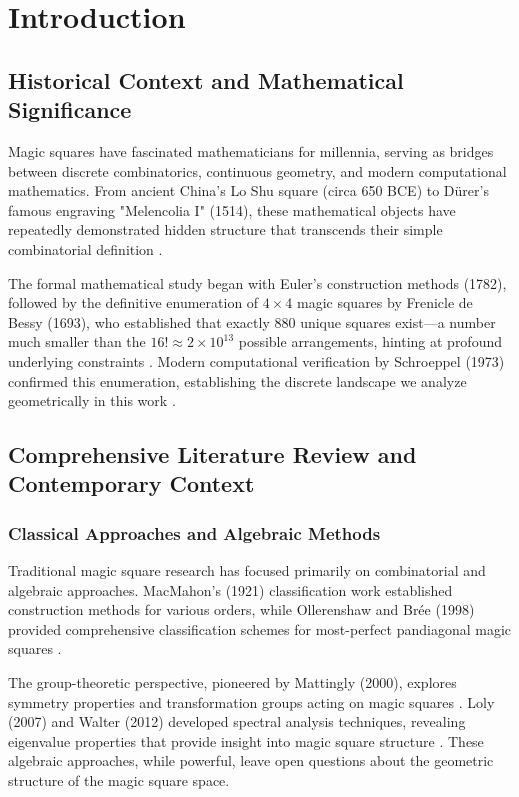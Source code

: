 \section{Introduction}\label{sec:introduction}

\subsection{Historical Context and Mathematical Significance}

Magic squares have fascinated mathematicians for millennia, serving as bridges between discrete combinatorics, continuous geometry, and modern computational mathematics. From ancient China's Lo Shu square (circa 650 BCE) to Dürer's famous engraving "Melencolia I" (1514), these mathematical objects have repeatedly demonstrated hidden structure that transcends their simple combinatorial definition \citep{Cammann1960, Durer1514}.

The formal mathematical study began with Euler's construction methods (1782), followed by the definitive enumeration of $4 \times 4$ magic squares by Frenicle de Bessy (1693), who established that exactly 880 unique squares exist—a number much smaller than the $16! \approx 2 \times 10^{13}$ possible arrangements, hinting at profound underlying constraints \citep{Euler1782, Frenicle1693}. Modern computational verification by Schroeppel (1973) confirmed this enumeration, establishing the discrete landscape we analyze geometrically in this work \citep{Schroeppel1973}.

\subsection{Comprehensive Literature Review and Contemporary Context}

\subsubsection{Classical Approaches and Algebraic Methods}

Traditional magic square research has focused primarily on combinatorial and algebraic approaches. MacMahon's (1921) classification work established construction methods for various orders, while Ollerenshaw and Brée (1998) provided comprehensive classification schemes for most-perfect pandiagonal magic squares \citep{MacMahon1921, Ollerenshaw1998}.

The group-theoretic perspective, pioneered by Mattingly (2000), explores symmetry properties and transformation groups acting on magic squares \citep{Mattingly2000}. Loly (2007) and Walter (2012) developed spectral analysis techniques, revealing eigenvalue properties that provide insight into magic square structure \citep{Loly2007, Walter2012}. These algebraic approaches, while powerful, leave open questions about the geometric structure of the magic square space.

